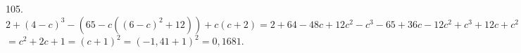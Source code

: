 105. $2+(4-c)^3-(65-c((6-c)^2+12))+c(c+2)=2+64-48c+12c^2-c^3-65+36c-12c^2+c^3+12c+c^2+2c=$\\$=c^2+2c+1=(c+1)^2=(-1,41+1)^2=0,1681.$\\
